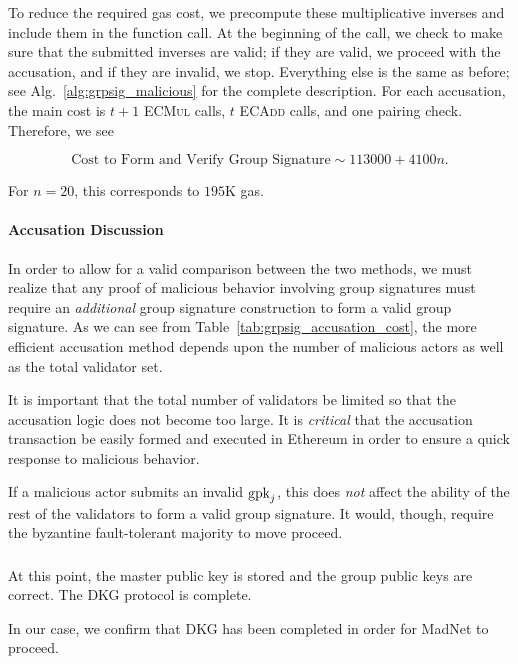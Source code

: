To reduce the required gas cost, we precompute these
multiplicative inverses and include them in the function call.
At the beginning of the call, we check to make sure that the submitted
inverses are valid; if they are valid, we proceed with the
accusation, and if they are invalid, we stop.
Everything else is the same as before;
see Alg.~\ref{alg:grpsig_malicious} for the complete description.
For each accusation, the main cost is $t+1$ \textsc{ECMul} calls,
$t$ \textsc{ECAdd} calls,
and one pairing check.
Therefore, we see

\begin{equation}
    \text{Cost to Form and Verify Group Signature} \sim 113000 + 4100n.
\end{equation}

\noindent
For $n=20$, this corresponds to $195$K gas.



\paragraph{Accusation Discussion}
In order to allow for a valid comparison between the two methods,
we must realize that any proof of malicious behavior involving
group signatures must require an \emph{additional} group signature
construction to form a valid group signature.
As we can see from Table~\ref{tab:grpsig_accusation_cost},
the more efficient accusation method depends upon
the number of malicious actors as well as the total validator set.

It is important that the total number of validators be limited
so that the accusation logic does not become too large.
It is \emph{critical} that the accusation transaction
be easily formed and executed in Ethereum in order to ensure
a quick response to malicious behavior.

If a malicious actor submits an invalid $\textrm{gpk}_{j}$,
this does \emph{not} affect the ability of the rest of the validators
to form a valid group signature.
It would, though, require the byzantine fault-tolerant majority
to move proceed.







\subsubsection{\Completion{}}

At this point, the master public key is stored
and the group public keys are correct.
The DKG protocol is complete.

In our case, we confirm that DKG has been completed in order
for MadNet to proceed.


